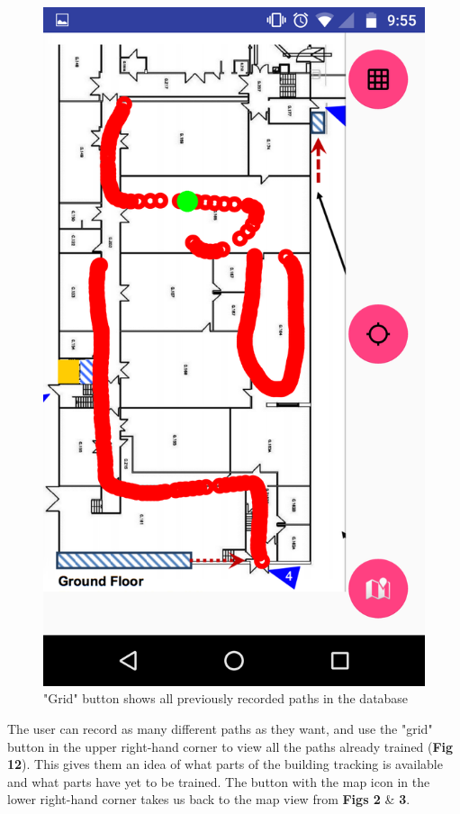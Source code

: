 \documentclass[10.8pt]{article}
\begin{document}
\begin{figure}[H]
\begin{minipage}[b]{.3\textwidth}
        \includegraphics[scale=1.2, width=\linewidth]{pic14.png}  
        \caption{"Grid" button shows all previously recorded paths in the database}  
    \end{minipage}  
\end{figure}

The user can record as many different paths as they want, and use the "grid" button in the upper right-hand corner to view all the paths already trained (\textbf{Fig 12}). This gives them an idea of what parts of the building tracking is available and what parts have yet to be trained. The button with the map icon in the lower right-hand corner takes us back to the map view from \textbf{Figs 2} \& \textbf{3}.
\end{document}
